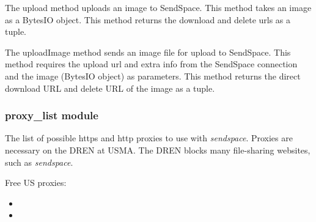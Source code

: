 \documentclass[letterpaper,10pt,english]{sphinxmanual}
\begin{document}
\begin{fulllineitems}

\begin{fulllineitems}
\label{Web_Connection:Web_Connection.api_cons.SendSpace.upload}
The upload method uploads an image to SendSpace.
This method takes an image as a BytesIO object.
This method returns the download and delete urls as a tuple.

\end{fulllineitems}


\begin{fulllineitems}
\label{Web_Connection:Web_Connection.api_cons.SendSpace.uploadImage}
The uploadImage method sends an image file for upload to SendSpace.
This method requires the upload url and extra info from the SendSpace
connection and the image (BytesIO object) as parameters.
This method returns the direct download URL and delete URL of the image
as a tuple.

\end{fulllineitems}


\end{fulllineitems}



\subsubsection{proxy\_list module}
\label{Web_Connection:proxy-list-module}
The list of possible https and http proxies to use with \emph{sendspace}. Proxies are necessary on the DREN at USMA.
The DREN blocks many file-sharing websites, such as \emph{sendspace}.

Free US proxies:
\begin{itemize}
\item {} 

\item {} 

\end{itemize}
\end{document}
